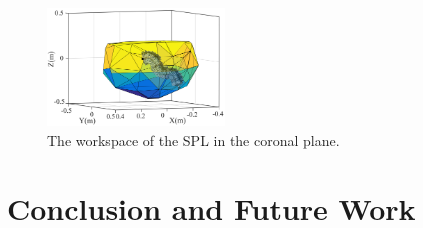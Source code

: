 \documentclass[letterpaper, 10 pt, conference]{ieeeconf}  %
\begin{document}
\begin{figure}[t!]
% 
% 
% 
% 
\centering
\includegraphics[width=0.42\textwidth]{Figures/Workspace_Fabric_ARM_V4}
\setlength{\belowcaptionskip}{-18pt}
\caption{The workspace of the SPL in the coronal plane.}
\label{fig:workspace_fabric_arm}
\end{figure}


\section{Conclusion and Future Work}
\end{document}
